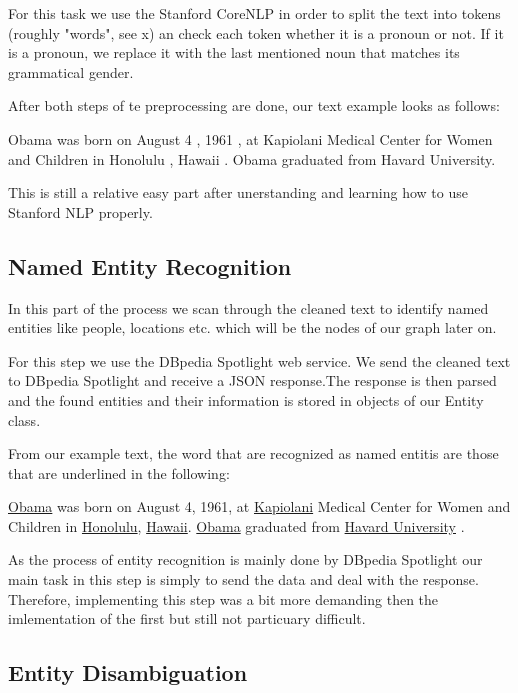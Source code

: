 \documentclass[runningheads]{llncs}
\begin{document}
For this task we use the Stanford CoreNLP in order to split the text into tokens (roughly "words", see x) an check each token whether it is a pronoun or not. If it is a pronoun, we replace it with the last mentioned noun that matches its grammatical gender.

After both steps of te preprocessing are done, our text example looks as follows:
\begin{example} Obama was born on August 4 , 1961 , at Kapiolani Medical Center for Women and Children in Honolulu , Hawaii . Obama graduated from Havard University. \end{example}

This is still a relative easy part after unerstanding and learning how to use Stanford NLP properly.

\subsection{Named Entity Recognition}
In this part of the process we scan through the cleaned text to identify named entities like people, locations etc. which will be the nodes of our graph later on. 

For this step we use the DBpedia Spotlight web service. We send the cleaned text to DBpedia Spotlight and receive a JSON response.The response is then parsed and the found entities and their information is stored in objects of our Entity class.

From our example text, the word that are recognized as named entitis are those that are underlined in the following:

\begin{example}\underline{Obama} was born on August 4, 1961, at \underline{Kapiolani} Medical Center for Women and Children in \underline{Honolulu}, \underline{Hawaii}. \underline{Obama} graduated from \underline{Havard University} .\end{example}

As the process of entity recognition is mainly done by DBpedia Spotlight our main task in this step is simply to send the data and deal with the response. Therefore, implementing this step was a bit more demanding then the imlementation of the first but still not particuary difficult.

\subsection{Entity Disambiguation}
\end{document}
